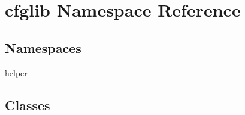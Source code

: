 \hypertarget{namespacecfglib}{}\section{cfglib Namespace Reference}
\label{namespacecfglib}
\subsection*{Namespaces}
\begin{DoxyCompactItemize}
\item 
 \hyperlink{namespacecfglib_1_1helper}{helper}
\end{DoxyCompactItemize}
\subsection*{Classes}
